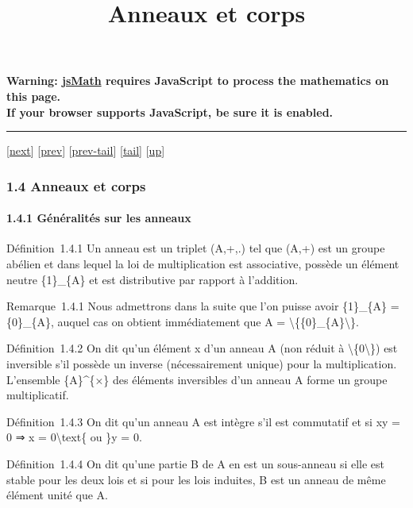 \documentclass[]{article}
\title{Anneaux et corps}
\author{}
\date{}
\begin{document}
\maketitle

\textbf{Warning: \href{http://www.math.union.edu/locate/jsMath}{jsMath}
requires JavaScript to process the mathematics on this page.\\ If your
browser supports JavaScript, be sure it is enabled.}

\begin{center}\rule{3in}{0.4pt}\end{center}

{[}\href{coursse5.html}{next}{]} {[}\href{coursse3.html}{prev}{]}
{[}\href{coursse3.html\#tailcoursse3.html}{prev-tail}{]}
{[}\hyperref[tailcoursse4.html]{tail}{]}
{[}\href{coursch2.html\#coursse4.html}{up}{]}

\subsubsection{1.4 Anneaux et corps}

\paragraph{1.4.1 Généralités sur les anneaux}

Définition~1.4.1 Un anneau est un triplet (A,+,.) tel que (A,+) est un
groupe abélien et dans lequel la loi de multiplication est associative,
possède un élément neutre \{1\}\_\{A\} et est distributive par rapport à
l'addition.

Remarque~1.4.1 Nous admettrons dans la suite que l'on puisse avoir
\{1\}\_\{A\} = \{0\}\_\{A\}, auquel cas on obtient immédiatement que A =
\textbackslash{}\{\{0\}\_\{A\}\textbackslash{}\}.

Définition~1.4.2 On dit qu'un élément x d'un anneau A (non réduit à
\textbackslash{}\{0\textbackslash{}\}) est inversible s'il possède un
inverse (nécessairement unique) pour la multiplication. L'ensemble
\{A\}\^{}\{×\} des éléments inversibles d'un anneau A forme un groupe
multiplicatif.

Définition~1.4.3 On dit qu'un anneau A est intègre s'il est commutatif
et si xy = 0 ⇒ x = 0\textbackslash{}text\{ ou \}y = 0.

Définition~1.4.4 On dit qu'une partie B de A en est un sous-anneau si
elle est stable pour les deux lois et si pour les lois induites, B est
un anneau de même élément unité que A.
\end{document}
